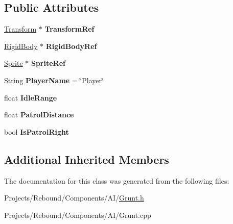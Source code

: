 \subsection*{Public Attributes}
\begin{DoxyCompactItemize}
\item 
\hypertarget{classDCEngine_1_1Components_1_1Grunt_a9c4fce2f1fb686f83f9cae3d804b983b}{\hyperlink{classDCEngine_1_1Components_1_1Transform}{Transform} $\ast$ {\bfseries Transform\-Ref}}\label{classDCEngine_1_1Components_1_1Grunt_a9c4fce2f1fb686f83f9cae3d804b983b}

\item 
\hypertarget{classDCEngine_1_1Components_1_1Grunt_a00e2f078b9b49d40c0c335081c22fe48}{\hyperlink{classDCEngine_1_1Components_1_1RigidBody}{Rigid\-Body} $\ast$ {\bfseries Rigid\-Body\-Ref}}\label{classDCEngine_1_1Components_1_1Grunt_a00e2f078b9b49d40c0c335081c22fe48}

\item 
\hypertarget{classDCEngine_1_1Components_1_1Grunt_ac1c3099bf7e6613db13c7d09552c5bfc}{\hyperlink{classDCEngine_1_1Components_1_1Sprite}{Sprite} $\ast$ {\bfseries Sprite\-Ref}}\label{classDCEngine_1_1Components_1_1Grunt_ac1c3099bf7e6613db13c7d09552c5bfc}

\item 
\hypertarget{classDCEngine_1_1Components_1_1Grunt_a569028d04935233c5a7dc1a3fef73b72}{String {\bfseries Player\-Name} = \char`\"{}Player\char`\"{}}\label{classDCEngine_1_1Components_1_1Grunt_a569028d04935233c5a7dc1a3fef73b72}

\item 
\hypertarget{classDCEngine_1_1Components_1_1Grunt_a9768adccff1b6473412bce37beac8862}{float {\bfseries Idle\-Range}}\label{classDCEngine_1_1Components_1_1Grunt_a9768adccff1b6473412bce37beac8862}

\item 
\hypertarget{classDCEngine_1_1Components_1_1Grunt_ac4e9a1e46a1e345bd6d2d2ba12c47bde}{float {\bfseries Patrol\-Distance}}\label{classDCEngine_1_1Components_1_1Grunt_ac4e9a1e46a1e345bd6d2d2ba12c47bde}

\item 
\hypertarget{classDCEngine_1_1Components_1_1Grunt_a033054c5e72e79459bd21a72f9247af4}{bool {\bfseries Is\-Patrol\-Right}}\label{classDCEngine_1_1Components_1_1Grunt_a033054c5e72e79459bd21a72f9247af4}

\end{DoxyCompactItemize}
\subsection*{Additional Inherited Members}


The documentation for this class was generated from the following files\-:\begin{DoxyCompactItemize}
\item 
Projects/\-Rebound/\-Components/\-A\-I/\hyperlink{Grunt_8h}{Grunt.\-h}\item 
Projects/\-Rebound/\-Components/\-A\-I/Grunt.\-cpp\end{DoxyCompactItemize}

